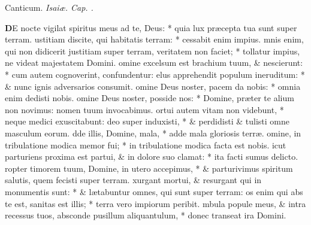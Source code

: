 \documentclass[letter,11pt]{book}
\begin{document}
\begin{multicols*}{2}
\vspace{-.5em} \begin{center} \color{Red} Canticum. \color{black} \itshape Isai\ae . Cap. . \end{center} \vspace{-.5em}
\lettrine[lines=2]{\bfseries \color{Red} D}{}E nocte vigilat spiritus meus ad te, Deus: * quia lux pr\ae cepta tua sunt super terram.
ustitiam discite, qui habitatis terram: * cessabit enim impius.
mnis enim, qui non didicerit justitiam super terram, veritatem non faciet; * tollatur impius, ne videat majestatem Domini.
omine excelsum est brachium tuum, \& nescierunt: * cum autem cognoverint, confundentur:
elus apprehendit populum ineruditum: * \& nunc ignis adversarios consumit.
omine Deus noster, pacem da nobis: * omnia enim dedisti nobis.
omine Deus noster, posside nos: * Domine, pr\ae ter te alium non novimus: nomen tuum invocabimus.
ortui autem vitam non videbunt, * neque medici exuscitabunt:
deo super induxisti, * \& perdidisti \& tulisti omne masculum eorum.
dde illis, Domine, mala, * adde mala gloriosis terr\ae .
omine, in tribulatione modica memor fui; * in tribulatione modica facta est nobis.
icut parturiens proxima est partui, \& in dolore suo clamat: * ita facti sumus delicto.
ropter timorem tuum, Domine, in utero accepimus, * \& parturivimus spiritum salutis, quem fecisti super terram.
xurgant mortui, \& resurgant qui in monumentis sunt: * \& l\ae tabuntur omnes, qui sunt super terram:
os enim qui abs te est, sanitas est illis; * terra vero impiorum peribit.
mbula popule meus, \& intra recessus tuos, absconde pusillum aliquantulum, * donec transeat ira Domini.

\end{multicols*}
\end{document}
